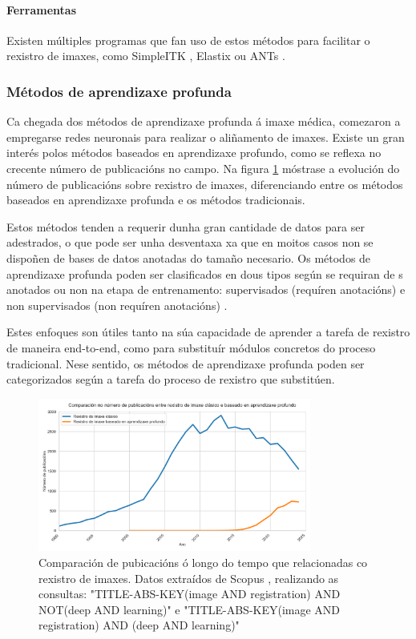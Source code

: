 \paragraph{Ferramentas}

Existen múltiples programas que fan uso de estos métodos para facilitar o rexistro de imaxes, como SimpleITK \cite{simpleitk}, Elastix \cite{elastix} ou ANTs \cite{ants}.

\subsubsection{Métodos de aprendizaxe profunda}
\label{subsubsec:Métodos de aprendizaxe profunda}

Ca chegada dos métodos de aprendizaxe profunda á imaxe médica, comezaron a empregarse redes neuronais para realizar o aliñamento de imaxes.
Existe un gran interés polos métodos baseados en aprendizaxe profundo, como se reflexa no crecente número de publicacións no campo. Na figura \ref{fig:method_comp} móstrase a evolución do número de publicacións sobre rexistro de imaxes, diferenciando entre os métodos baseados en aprendizaxe profunda e os métodos tradicionais.

Estos métodos tenden a requerir dunha gran cantidade de datos para ser adestrados, o que pode ser unha desventaxa xa que en moitos casos non se dispoñen de bases de datos anotadas do tamaño necesario.
Os métodos de aprendizaxe profunda poden ser clasificados en dous tipos según se requiran de s anotados ou non na etapa de entrenamento:
supervisados (requíren anotacións) e non supervisados (non requíren anotacións) \cite{nie2024medicalimageregistrationapplication}.

Estes enfoques son útiles tanto na súa capacidade de aprender a tarefa de rexistro de maneira end-to-end, como para substituír módulos concretos do proceso tradicional.
Nese sentido, os métodos de aprendizaxe profunda poden ser categorizados según a tarefa do proceso de rexistro que substitúen.

\begin{figure}[hp!]
\centering
\includegraphics[width=0.8\textwidth]{imaxes/methods_comp.png}
\caption{Comparación de pubicacións ó longo do tempo que relacionadas co rexistro de imaxes. Datos extraídos de Scopus \cite{scopus}, realizando as consultas: "TITLE-ABS-KEY(image AND registration) AND NOT(deep AND learning)" e "TITLE-ABS-KEY(image AND registration) AND (deep AND learning)"}
\label{fig:method_comp}
\end{figure}


